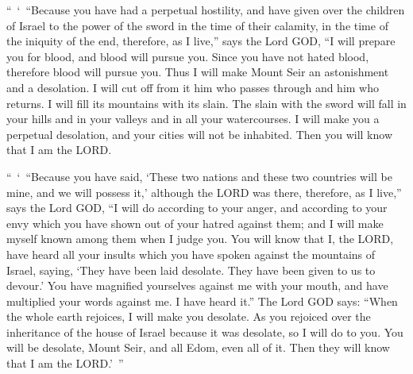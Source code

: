 \myverse{}“ ‘ “Because you have had a perpetual hostility, and have given
over the children of Israel to the power of the sword in the time of their calamity, in the time of the
iniquity of the end,
\myverse{}therefore, as I live,” says the Lord GOD, “I will prepare you for blood, and
blood will pursue you. Since you have not hated blood, therefore blood will pursue you.
\myverse{}Thus I will make Mount Seir an astonishment and a desolation. I will cut off
from it him who passes through and him who returns.
\myverse{}I will fill its mountains with its slain. The slain with the sword will fall
in your hills and in your valleys and in all your watercourses.
\myverse{}I will make you a perpetual desolation, and your cities will not be inhabited.
Then you will know that I am the LORD.

\myverse{}“ ‘ “Because you have said, ‘These two nations and these two countries
will be mine, and we will possess it,’ although the LORD was there,
\myverse{}therefore, as I live,” says the Lord GOD, “I will do according to your anger,
and according to your envy which you have shown out of your hatred against them; and I will make myself
known among them when I judge you.
\myverse{}You will know that I, the LORD, have heard all your insults which you have
spoken against the mountains of Israel, saying, ‘They have been laid desolate. They have been given to
us to devour.’
\myverse{}You have magnified yourselves against me with your mouth, and have multiplied
your words against me. I have heard it.”
\myverse{}The Lord GOD says: “When the whole earth rejoices, I will make you desolate.
\myverse{}As you rejoiced over the inheritance of the house of Israel because it was
desolate, so I will do to you. You will be desolate, Mount Seir, and all Edom, even all of it. Then they
will know that I am the LORD.’ ”


